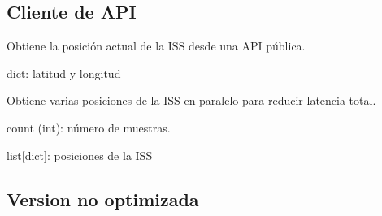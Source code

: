 \documentclass[letterpaper,10pt,spanish]{sphinxmanual}
\begin{document}
\subsection{Cliente de API}
\label{\detokenize{modulos:module-api}}\label{\detokenize{modulos:cliente-de-api}}

\begin{fulllineitems}
\label{\detokenize{modulos:api.get_iss_position}}
\pysigstartsignatures
\pysiglinewithargsret
{}
{}
{}
\pysigstopsignatures
\sphinxAtStartPar
Obtiene la posición actual de la ISS desde una API pública.
\begin{description}
\sphinxAtStartPar
dict: latitud y longitud

\end{description}

\end{fulllineitems}


\begin{fulllineitems}
\label{\detokenize{modulos:api.get_iss_positions_parallel}}
\pysigstartsignatures
\pysiglinewithargsret
{}
{}
{}
\pysigstopsignatures
\sphinxAtStartPar
Obtiene varias posiciones de la ISS en paralelo para reducir latencia total.
\begin{description}
\sphinxAtStartPar
count (int): número de muestras.

\sphinxAtStartPar
list{[}dict{]}: posiciones de la ISS

\end{description}

\end{fulllineitems}



\subsection{Version no optimizada}
\label{\detokenize{modulos:module-no_opt}}\label{\detokenize{modulos:version-no-optimizada}}
\end{document}
